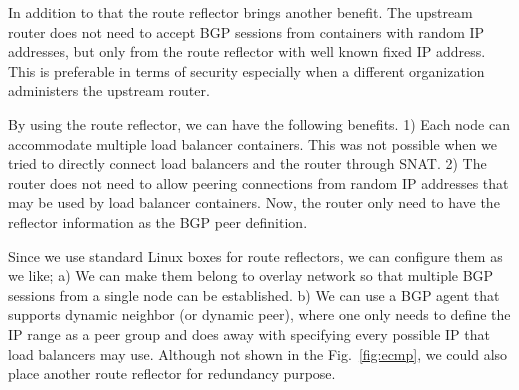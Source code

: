 In addition to that the route reflector brings another benefit. 
The upstream router does not need to accept BGP sessions from containers with random IP addresses, but only from the route reflector with well known fixed IP address. 
This is preferable in terms of security especially when a different organization administers the upstream router.

By using the route reflector, we can have the following benefits.
1) Each node can accommodate multiple load balancer containers. This was not possible when we tried to directly connect load balancers and the router through SNAT.
2) The router does not need to allow peering connections from random IP addresses that may be used by load balancer containers. Now, the router only need to have the reflector information as the BGP peer definition.

Since we use standard Linux boxes for route reflectors, we can configure them as we like;
a) We can make them belong to overlay network so that multiple BGP sessions from a single node can be established.
b) We can use a BGP agent that supports dynamic neighbor (or dynamic peer), where one only needs to define the IP range as a peer group and does away with specifying every possible IP that load balancers may use.
Although not shown in the Fig.~\ref{fig:ecmp}, we could also place another route reflector for redundancy purpose.


\FloatBarrier


